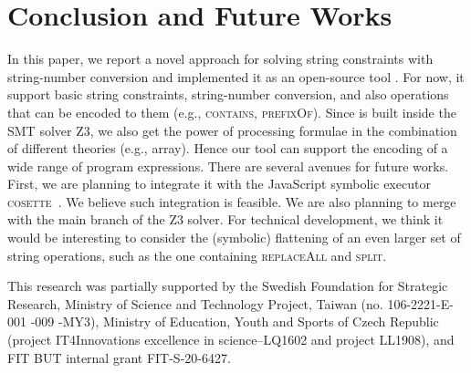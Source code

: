 \documentclass[sigplan,screen]{acmart}
\begin{document}
\section{Conclusion and Future Works}
\label{section:conclusion}
In this paper, we report a novel approach for solving string constraints with string-number conversion and implemented it as an open-source tool {\tool}. For now, it support basic string constraints, string-number conversion, and also operations that can be encoded to them (e.g., \textsc{contains}, \textsc{prefixOf}). Since {\tool} is built inside the SMT solver Z3, we also get the power of processing formulae in the combination of different theories (e.g., array). Hence our tool can support the encoding of a wide range of program expressions. There are several avenues for future works. First, we are planning to integrate it with the JavaScript symbolic executor \textsc{cosette}~\cite{santos2018symbolic}. We  believe such integration  is feasible. 
We are also planning to merge  {\tool}  with the main branch of the Z3 solver. For technical development, we think it would be interesting to consider the (symbolic) flattening of an even larger set of string operations, such as the one containing  \textsc{replaceAll} and \textsc{split}. 




\begin{acks}
This research was  partially supported by the  Swedish Foundation for Strategic Research, Ministry of Science and Technology Project, Taiwan (no. 106-2221-E-001 -009 -MY3), Ministry of Education, Youth and Sports of Czech Republic (project IT4Innovations excellence in science--LQ1602 and project LL1908), and FIT BUT internal grant FIT-S-20-6427.

\end{acks}

 \balance


\end{document}
